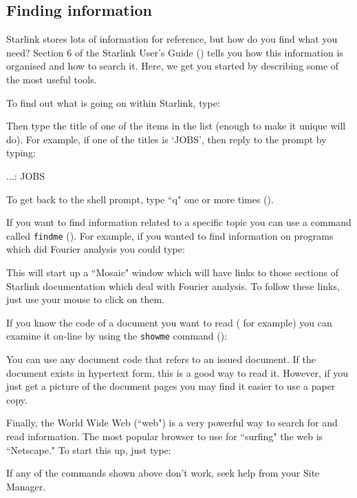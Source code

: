 \documentclass[twoside,11pt,nolof]{starlink}
\begin{document}
\subsection{Finding information}

Starlink stores lots of information for reference, but how do you find
what you need?
Section 6 of the Starlink User's Guide
() tells you how this
information is organised and how to search it.
Here, we get you started by describing some of the most useful tools.

To find out what is going on within Starlink, type:
\begin{terminalv}
\end{terminalv}
Then type the title of one of the items in the list (enough to make it
unique will do).
For example, if one of the titles is `JOBS', then reply to the prompt
by typing:
\begin{terminalv}
...: JOBS
\end{terminalv}
To get back to the shell prompt, type ``q" one or more times
().

If you want to find information related to a specific topic you can use a
command called \texttt{findme} ().
For example, if you wanted to find information on programs which did
Fourier analysis you could type:
\begin{terminalv}
\end{terminalv}
This will start up a ``Mosaic" window which will have links to those sections
of Starlink documentation which deal with Fourier analysis.
To follow these links, just use your mouse to click on them.

If you know the code of a document you want to read
( for example)
you can examine it on-line by using the \texttt{showme} command
():
\begin{terminalv}
\end{terminalv}
You can use any document code that refers to an issued document.
If the document exists in hypertext form, this is a good way to read it.
However, if you just get a picture of the document pages you may find it
easier to use a paper copy.

Finally, the World Wide Web (``web") is a very powerful way to search for and
read information.
The most popular browser to use for ``surfing" the web is ``Netscape."
To start this up, just type:
\begin{terminalv}
\end{terminalv}
If any of the commands shown above don't work, seek help from your Site
Manager.
\end{document}
